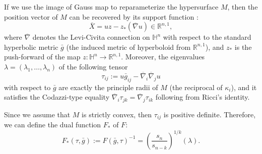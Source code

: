 \documentclass[reqno]{amsart}
\theoremstyle{remark}
\newcommand{\R}{\ensuremath{\mathbb{R}}}
\renewcommand{\H}{{\mathbb{H}}}
\newcommand{\bnabla}{\overline{\nabla}}
\newcommand{\bg}{\bar{g}}
\theoremstyle{definition}
\numberwithin{equation}{section}
\begin{document}
If we use the image of Gauss map to reparameterize the hypersurface \(M\), then the position vector of \(M\) can be recovered by its support function \cite{co-compact}:
\begin{equation}
    \bar{X} = uz - z_{*}(\bnabla u) \in \R^{n,1},
\end{equation}
where $\bnabla$ denotes the Levi-Civita connection on \(\H^n\) with respect to the standard hyperbolic metric \(\bg\) (the induced metric of hyperboloid from \(\R^{n,1}\)), and $z_*$ is the push-forward of the map $z:\H^n\rightarrow \R^{n,1}$.  
Moreover, the eigenvalues \( \lambda=(\lambda_1,\dots,\lambda_n)\) of the following tensor
\begin{equation}
    \tau_{ij} := u \bg_{ij} - \bnabla_i \bnabla_j u
\end{equation}
with respect  to \(\bg\) are exactly the principle radii of \(M\) (the reciprocal  of \(\kappa_i\)), and it satisfies the Codazzi-type equality \(\bnabla_i \tau_{jk} = \bnabla_{j}\tau_{ik}\) following from Ricci's identity. 


\par Since we assume that $M$ is strictly convex, then  \(\tau_{ij}\) is positive definite. Therefore, we can define the dual function \(F_{*}\) of \(F\): 
\[F_{*}(\tau,\bar{g}) := F(\bar{g},\tau)^{-1}=\left(\frac{s_n}{s_{n-k}}\right)^{1/k}(\lambda).\]
\end{document}
